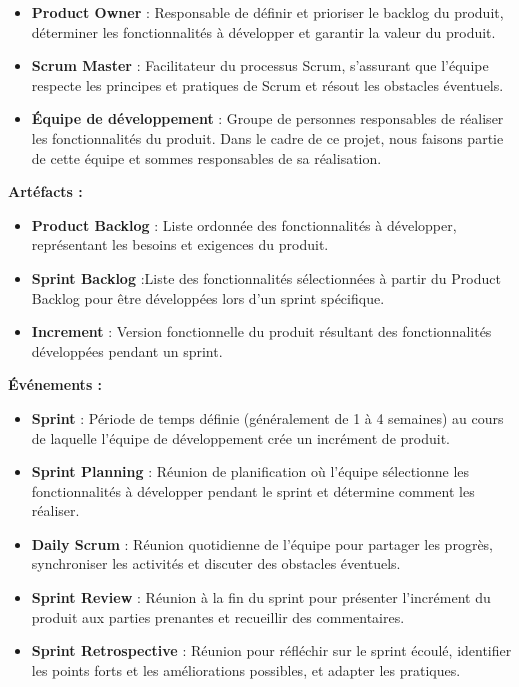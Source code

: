 \begin{itemize}
    \item \textbf{Product Owner} : Responsable de définir et prioriser le backlog du produit, déterminer les fonctionnalités à développer et garantir la valeur du produit.

    \item \textbf{Scrum Master} : Facilitateur du processus Scrum, s'assurant que l'équipe respecte les principes et pratiques de Scrum et résout les obstacles éventuels.

    \item \textbf{Équipe de développement} : Groupe de personnes responsables de réaliser les fonctionnalités du produit. Dans le cadre de ce projet, nous faisons partie de cette équipe et sommes responsables de sa réalisation.
\end{itemize}



\textbf{Artéfacts :}


\begin{itemize}
    \item \textbf{Product Backlog} : Liste ordonnée des fonctionnalités à développer, représentant les besoins et exigences du produit.

    \item \textbf{Sprint Backlog} :Liste des fonctionnalités sélectionnées à partir du Product Backlog pour être développées lors d'un sprint spécifique.

    \item \textbf{Increment} : Version fonctionnelle du produit résultant des fonctionnalités développées pendant un sprint.
\end{itemize}


\textbf{Événements :}


\begin{itemize}
    \item \textbf{Sprint} : Période de temps définie (généralement de 1 à 4 semaines) au cours de laquelle l'équipe de développement crée un incrément de produit.

    \item \textbf{Sprint Planning} : Réunion de planification où l'équipe sélectionne les fonctionnalités à développer pendant le sprint et détermine comment les réaliser.

    \item \textbf{Daily Scrum} : Réunion quotidienne de l'équipe pour partager les progrès, synchroniser les activités et discuter des obstacles éventuels.

    \item \textbf{Sprint Review} : Réunion à la fin du sprint pour présenter l'incrément du produit aux parties prenantes et recueillir des commentaires.

    \item \textbf{Sprint Retrospective} : Réunion pour réfléchir sur le sprint écoulé, identifier les points forts et les améliorations possibles, et adapter les pratiques.


\end{itemize}


